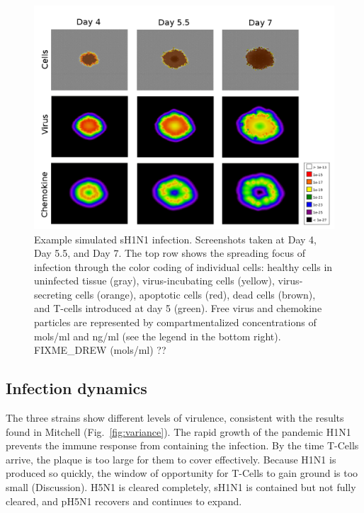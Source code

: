 \documentclass[10pt]{article}
\begin{document}
\begin{figure}[ht!]
\begin{center}
 \includegraphics[width=\textwidth]{cycells}
 \end{center}
\caption{Example simulated sH1N1 infection. Screenshots taken at Day 4, Day 5.5, and Day 7.  The top row shows the spreading focus of infection  through the color coding of individual cells:  healthy cells in uninfected tissue (gray),  virus-incubating cells (yellow), virus-secreting cells (orange), apoptotic cells (red), dead cells (brown), and T-cells introduced at day 5 (green).  Free virus and chemokine particles are represented by compartmentalized concentrations of mols/ml and ng/ml (see the legend in the bottom right).  
FIXME_DREW (mols/ml) ??} 
 \label{fig:cycells}
\end{figure}



\subsection*{Infection dynamics}

The three strains show different levels of virulence, consistent with the results found in Mitchell (Fig.~\ref{fig:variance}).  The rapid growth of the pandemic H1N1 prevents the immune response from containing the infection.  By the time T-Cells arrive, the plaque is too large for them  to cover effectively.  Because H1N1 is produced so quickly, the window of opportunity for T-Cells to gain ground is too small (Discussion).  H5N1 is cleared completely, sH1N1 is contained but not fully cleared, and pH5N1 recovers and continues to expand.
\end{document}
